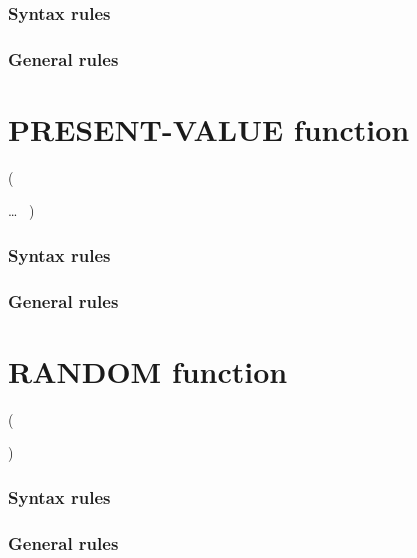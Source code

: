 \begin{syntax}
   
\end{syntax}

\subsubsection{Syntax rules}

\subsubsection{General rules}

\section{PRESENT-VALUE function}

\begin{syntax}
    (
  \argument \argument
  \begin{0-1}
    \argument
  \end{0-1} \ldots
  \ {})
\end{syntax}

\subsubsection{Syntax rules}

\subsubsection{General rules}

\section{RANDOM function}

\begin{syntax}
    (
  \begin{0-1}
    \argument
  \end{0-1}
  )
\end{syntax}

\subsubsection{Syntax rules}

\subsubsection{General rules}

